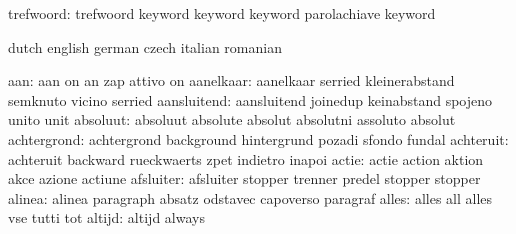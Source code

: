 trefwoord: trefwoord keyword
           keyword keyword
           parolachiave keyword



\stopconstants




\startvariables            dutch                     english
                           german                    czech
                           italian                   romanian

                      aan: aan                       on
                           an                        zap
                           attivo                    on
                aanelkaar: aanelkaar                 serried
                           kleinerabstand            semknuto
                           vicino                    serried
              aansluitend: aansluitend               joinedup
                           keinabstand               spojeno
                           unito                     unit
                 absoluut: absoluut                  absolute
                           absolut                   absolutni
                           assoluto                  absolut
              achtergrond: achtergrond               background
                           hintergrund               pozadi
                           sfondo                    fundal
                achteruit: achteruit                 backward
                           rueckwaerts               zpet
                           indietro                  inapoi
                    actie: actie                     action
                           aktion                    akce
                           azione                    actiune
                afsluiter: afsluiter                 stopper
                           trenner                   predel
                           stopper                   stopper
                   alinea: alinea                    paragraph
                           absatz                    odstavec
                           capoverso                 paragraf
                    alles: alles                     all
                           alles                     vse
                           tutti                     tot
                   altijd: altijd                    always
